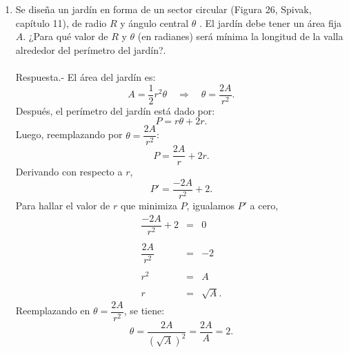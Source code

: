 \begin{enumerate}[\bfseries 1.]
    \item Se diseña un jardín en forma de un sector circular (Figura 26, Spivak, capítulo 11), de radio $R$ y ángulo central $\theta$ . El jardín debe tener un área fija $A$. ¿Para qué valor de $R$ y $\theta$ (en radianes) será mínima la longitud de la valla alrededor del perímetro del jardín?.\\\\
	Respuesta.-\; El área del jardín es:
	$$A=\dfrac{1}{2}r^2\theta\quad \Rightarrow \quad \theta=\dfrac{2A}{r^2}.$$
	Después, el perímetro del jardín está dado por:
	$$P=r\theta+2r.$$
	Luego, reemplazando por $\theta=\dfrac{2A}{r^2}$:
	$$P=\dfrac{2A}{r}+2r.$$
	Derivando con respecto a $r$,
	$$P'=\dfrac{-2A}{r^2}+2.$$
	Para hallar el valor de $r$ que minimiza $P$, igualamos $P'$ a cero,
	$$\begin{array}{rcl}
	    \dfrac{-2A}{r^2}+2&=&0\\\\
	    \dfrac{2A}{r^2}&=&-2\\\\
	    r^2&=&A\\\\
	    r&=&\sqrt{A}.
	\end{array}$$
	Reemplazando en $\theta=\dfrac{2A}{r^2}$, se tiene:
	$$\theta=\dfrac{2A}{(\sqrt{A})^2}=\dfrac{2A}{A}=2.$$\\


\end{enumerate}
